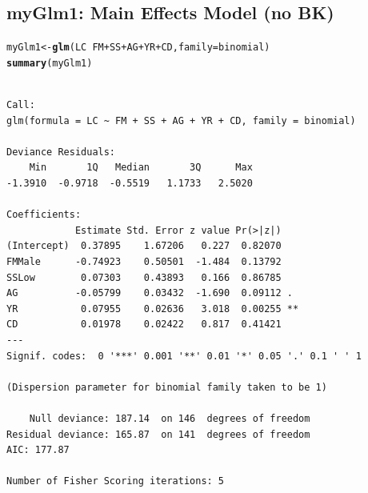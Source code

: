 \documentclass[oneside]{book}\usepackage[]{graphicx}\usepackage[svgnames]{xcolor}
\makeatletter
\newcommand{\hlopt}[1]{\textcolor[rgb]{0,0,0}{#1}}%
\newcommand{\hlstd}[1]{\textcolor[rgb]{0.345,0.345,0.345}{#1}}%
\newcommand{\hlkwb}[1]{\textcolor[rgb]{0.69,0.353,0.396}{#1}}%
\newcommand{\hlkwc}[1]{\textcolor[rgb]{0.333,0.667,0.333}{#1}}%
\newcommand{\hlkwd}[1]{\textcolor[rgb]{0.737,0.353,0.396}{\textbf{#1}}}%
\newenvironment{kframe}{%
 \def\at@end@of@kframe{}%
 \ifinner\ifhmode%
  \def\at@end@of@kframe{\end{minipage}}%
  \begin{minipage}{\columnwidth}%
 \fi\fi%
 \def\FrameCommand##1{\hskip\@totalleftmargin \hskip-\fboxsep
 \colorbox{shadecolor}{##1}\hskip-\fboxsep
     \hskip-\linewidth \hskip-\@totalleftmargin \hskip\columnwidth}%
 \MakeFramed {\advance\hsize-\width
   \@totalleftmargin\z@ \linewidth\hsize
   \@setminipage}}%
 {\par\unskip\endMakeFramed%
 \at@end@of@kframe}
\newenvironment{knitrout}{}{} %
\makeatother
\begin{document}
\subsection*{myGlm1: Main Effects Model (no BK)}
\begin{knitrout}
\color{fgcolor}\begin{kframe}
\begin{alltt}
\hlstd{myGlm1} \hlkwb{<-} \hlkwd{glm}\hlstd{(LC} \hlopt{~} \hlstd{FM} \hlopt{+} \hlstd{SS} \hlopt{+} \hlstd{AG} \hlopt{+} \hlstd{YR} \hlopt{+} \hlstd{CD,} \hlkwc{family} \hlstd{= binomial)}
\hlkwd{summary}\hlstd{(myGlm1)}
\end{alltt}
\begin{verbatim}

Call:
glm(formula = LC ~ FM + SS + AG + YR + CD, family = binomial)

Deviance Residuals: 
    Min       1Q   Median       3Q      Max  
-1.3910  -0.9718  -0.5519   1.1733   2.5020  

Coefficients:
            Estimate Std. Error z value Pr(>|z|)   
(Intercept)  0.37895    1.67206   0.227  0.82070   
FMMale      -0.74923    0.50501  -1.484  0.13792   
SSLow        0.07303    0.43893   0.166  0.86785   
AG          -0.05799    0.03432  -1.690  0.09112 . 
YR           0.07955    0.02636   3.018  0.00255 **
CD           0.01978    0.02422   0.817  0.41421   
---
Signif. codes:  0 '***' 0.001 '**' 0.01 '*' 0.05 '.' 0.1 ' ' 1

(Dispersion parameter for binomial family taken to be 1)

    Null deviance: 187.14  on 146  degrees of freedom
Residual deviance: 165.87  on 141  degrees of freedom
AIC: 177.87

Number of Fisher Scoring iterations: 5
\end{verbatim}
\end{kframe}
\end{knitrout}
\end{document}
